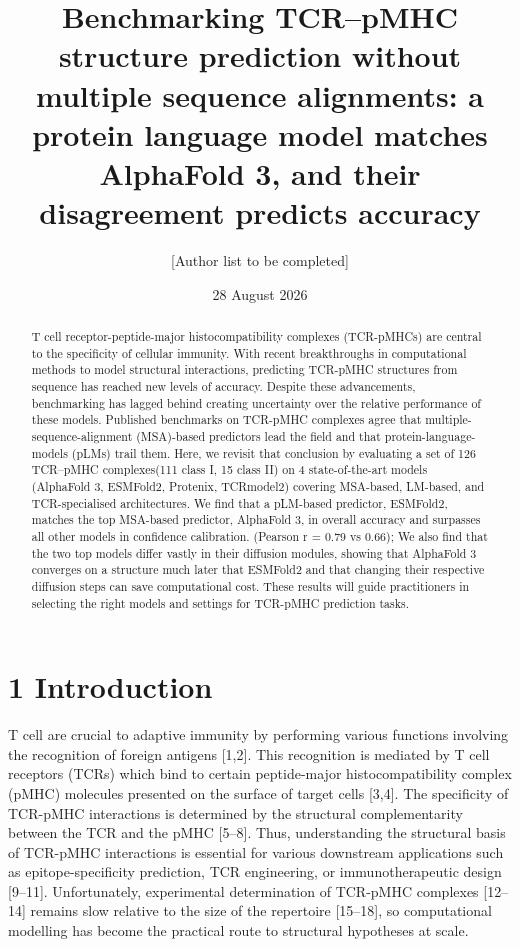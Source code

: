 \documentclass[
  11pt,
]{article}
\title{Benchmarking TCR--pMHC structure prediction without multiple
sequence alignments: a protein language model matches AlphaFold 3, and
their disagreement predicts accuracy}
\author{{[}Author list to be completed{]}}
\date{28 August 2026}
\begin{document}
\maketitle
\begin{abstract}
T cell receptor-peptide-major histocompatibility complexes (TCR-pMHCs) are
central to the specificity of cellular immunity. With recent breakthroughs
in computational methods to model structural interactions, predicting TCR-pMHC 
structures from sequence has reached new levels of accuracy. Despite these advancements,
benchmarking has lagged behind creating uncertainty over the relative performance
of these models. Published benchmarks on TCR-pMHC complexes agree that
multiple-sequence-alignment (MSA)-based predictors lead the field 
and that protein-language-models (pLMs) trail them. Here, we revisit that conclusion by evaluating a set of 
126 TCR--pMHC complexes(111 class I, 15 class II) on 4 state-of-the-art models
(AlphaFold 3, ESMFold2, Protenix, TCRmodel2) covering MSA-based, LM-based, 
and TCR-specialised architectures. We find that a pLM-based predictor, 
ESMFold2, matches the top MSA-based predictor, AlphaFold 3, in overall accuracy 
and surpasses all other models in confidence calibration.
(Pearson r = 0.79 vs 0.66); We also find that the two top models differ vastly in their
diffusion modules, showing that AlphaFold 3 converges on a structure much later that ESMFold2 and that
changing their respective diffusion steps can save computational cost. These results will 
guide practitioners in selecting the right models and settings for TCR-pMHC prediction tasks.  
\end{abstract}

\section{1 Introduction}\label{introduction}

T cell are crucial to adaptive immunity by performing various functions involving the 
recognition of foreign antigens {[}1,2{]}. This recognition is mediated by T cell receptors (TCRs) 
which bind to certain peptide-major histocompatibility complex (pMHC) molecules 
presented on the surface of target cells {[}3,4{]}. The specificity of TCR-pMHC interactions 
is determined by the structural complementarity between the TCR and the pMHC {[}5--8{]}.
Thus, understanding the structural basis of TCR-pMHC interactions is essential for 
various downstream applications such as epitope-specificity prediction, TCR
engineering, or immunotherapeutic design {[}9--11{]}.
Unfortunately, experimental determination of TCR-pMHC complexes {[}12--14{]}
remains slow relative to the size of the repertoire {[}15--18{]}, so
computational modelling has become the practical route to structural
hypotheses at scale. 
\end{document}
